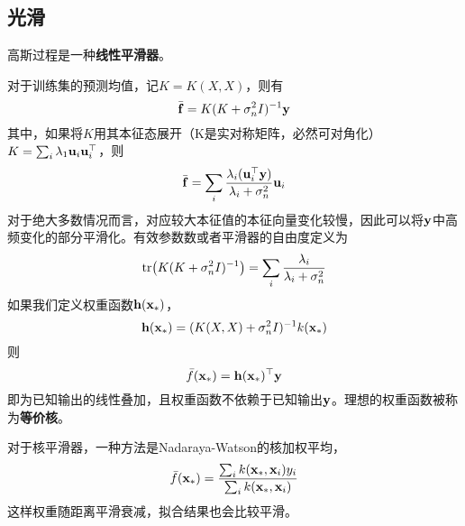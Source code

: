 \documentclass[12pt,UTF8]{article}
\begin{document}
        \subsection{光滑}
            高斯过程是一种\textbf{线性平滑器}。\par
            对于训练集的预测均值，记$K=K(X,X)$，则有
            \begin{equation}
                \bar{\vb{f}}=K(K+\sigma_n^2I)^{-1}\vb{y}
            \end{equation}
            其中，如果将$K$用其本征态展开（K是实对称矩阵，必然可对角化）$K=\sum_i{\lambda_1\vb{u}_i\vb{u}_i^\top}$，则
            \begin{equation}
                \bar{\vb{f}}=\sum_i{\frac{\lambda_i(\vb{u}_i^\top\vb{y})}{\lambda_i+\sigma_n^2}\vb{u}_i}
            \end{equation}
            对于绝大多数情况而言，对应较大本征值的本征向量变化较慢，因此可以将$\vb{y}$中高频变化的部分平滑化。有效参数数或者平滑器的自由度定义为
            \begin{equation}
                \tr(K(K+\sigma_n^2I)^{-1})=\sum_i{\frac{\lambda_i}{\lambda_i+\sigma_n^2}}
            \end{equation}
            如果我们定义权重函数$\vb{h}(\vb{x}_*)$，
            \begin{equation}
                \vb{h}(\vb{x}_*)=(K(X,X)+\sigma_n^2I)^{-1}k(\vb{x}_*)
            \end{equation}
            则
            \begin{equation}
                \bar{f}(\vb{x}_*)=\vb{h}(\vb{x}_*)^\top\vb{y}
            \end{equation}
            即为已知输出的线性叠加，且权重函数不依赖于已知输出$\vb{y}$。理想的权重函数被称为\textbf{等价核}。\par
            对于核平滑器，一种方法是Nadaraya-Watson的核加权平均，
            \begin{equation}
                \bar{f}(\vb{x}_*)=\frac{\sum_i{k(\vb{x}_*,\vb{x}_i)y_i}}{\sum_i{k(\vb{x}_*,\vb{x}_i)}}
            \end{equation}
            这样权重随距离平滑衰减，拟合结果也会比较平滑。
\end{document}

